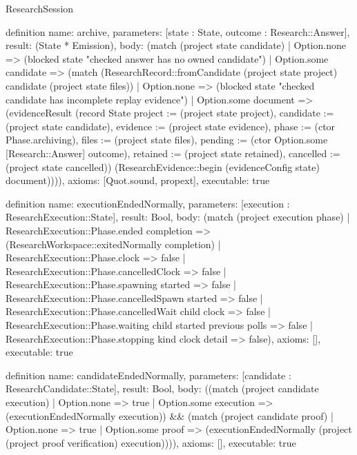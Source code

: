 \begin{lexlean}{ResearchSession}
\begin{semanticmodule}
definition{
 name: archive,
 parameters: [state : State, outcome : Research::Answer],
 result: (State * Emission),
 body: (match (project state candidate) | Option.none => (blocked state "checked answer has no owned candidate") | Option.some candidate => (match (ResearchRecord::fromCandidate (project state project) candidate (project state files)) | Option.none => (blocked state "checked candidate has incomplete replay evidence") | Option.some document => (evidenceResult (record State {project := (project state project), candidate := (project state candidate), evidence := (project state evidence), phase := (ctor Phase.archiving), files := (project state files), pending := (ctor Option.some [Research::Answer] outcome), retained := (project state retained), cancelled := (project state cancelled)}) (ResearchEvidence::begin (evidenceConfig state) document)))),
 axioms: [Quot.sound, propext],
 executable: true
}

definition{
 name: executionEndedNormally,
 parameters: [execution : ResearchExecution::State],
 result: Bool,
 body: (match (project execution phase) | ResearchExecution::Phase.ended completion => (ResearchWorkspace::exitedNormally completion) | ResearchExecution::Phase.clock => false | ResearchExecution::Phase.cancelledClock => false | ResearchExecution::Phase.spawning started => false | ResearchExecution::Phase.cancelledSpawn started => false | ResearchExecution::Phase.cancelledWait child clock => false | ResearchExecution::Phase.waiting child started previous polls => false | ResearchExecution::Phase.stopping kind clock detail => false),
 axioms: [],
 executable: true
}

definition{
 name: candidateEndedNormally,
 parameters: [candidate : ResearchCandidate::State],
 result: Bool,
 body: ((match (project candidate execution) | Option.none => true | Option.some execution => (executionEndedNormally execution)) && (match (project candidate proof) | Option.none => true | Option.some proof => (executionEndedNormally (project (project proof verification) execution)))),
 axioms: [],
 executable: true
}


\end{semanticmodule}
\end{lexlean}
